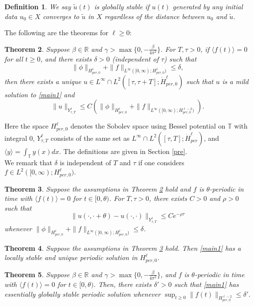 \documentclass[10pt,a4paper,final]{article}
\numberwithin{equation}{section}
\newtheorem{theorem}{Theorem}[section]
\newtheorem{definition}[theorem]{Definition}
\newcommand{\lan}{\langle}
\newcommand{\ran}{\rangle}
\newcommand{\R}{\mathbb{R}}
\newcommand{\bT}{\mathbb{T}}
\newcommand{\Gb}{\beta}
\newcommand{\Gd}{\delta}
\newcommand{\Gg}{\gamma}
\newcommand{\Gth}{\theta}
\begin{document}
\begin{definition}\label{de2-3}
    We say $\tilde u(t)$ is globally stable if  $u(t)$ generated by any initial data $u_0\in X$ converges to $\tilde u$ in $X$ regardless of the distance between $u_0$ and $\tilde u$.
\end{definition}

The following are the theorems for $\ell\ge 0$:

\begin{theorem} \label{thm1}
   Suppose $\Gb\in \R$ and $\Gg>\max\{0, -\frac{\Gb}{4\pi^2}\}$. For $T, \tau>0$, if $\lan f(t)\ran=0$ for all $t\geq0$, and  there exists $\Gd>0$ (independent of $\tau$) such that 
    $$\|\phi\|_{H^{\ell}_{per, 0}}+\|f\|_{L^{\infty}([0,\infty);H^{\ell}_{per, 0})}\leq \delta,$$ then there exists a unique $u\in L^{\infty}\cap L^2([\tau,\tau+T];\dot{H}^\ell_{per,0})$ such that $u$ is a mild solution to \eqref{main1} and  
    $$\|u\|_{Y^{\ell}_{\tau,T}}\leq C(\|\phi\|_{H^{\ell}_{per, 0}}+\|f\|_{L^{\infty}([0,\infty);H^{\ell-2}_{per, 0})}). $$
\end{theorem}
Here the space $H^{\ell}_{per, 0}$ denotes the Sobolev space using Bessel potential on $\bT$ with integral 0, $Y^\ell_{\tau,T}$ consists of the same set as $L^{\infty}\cap L^2([\tau,T];\dot{H}^\ell_{per})$, and $\lan y\ran=\int_{\bT}y(x)dx$. The definitions are given in Section \ref{pre}. \\

We remark that $\Gd$ is independent of $T$ and $\tau$ if one considers $f\in L^2([0,\infty);H^{\ell}_{per, 0})$.\\

\begin{theorem} \label{thm2}
     Suppose the assumptions in Theorem \ref{thm1} hold and $f$ is $\Gth$-periodic in time with $\lan f(t)\ran=0$ for $t\in [0,\Gth)$. For $T, \tau>0$, there exists $C>0$ and $\rho>0$ such that 
    $$\|u(\cdot, \cdot+\theta)-u(\cdot, \cdot)\|_{Y^{\ell}_{\tau,T}}\leq C e^{-\rho \tau}$$
    whenever $\|\phi\|_{H^{\ell}_{per, 0}}+\|f\|_{L^{\infty}([0,\infty);H^{\ell}_{per, 0})}\leq \delta$.
\end{theorem}
\begin{theorem} \label{thm3}
   Suppose the assumptions in Theorem \ref{thm2} hold. Then \eqref{main1} has a locally stable and unique periodic solution in $H^{\ell}_{per, 0}$. 
\end{theorem}
\begin{theorem}  \label{thm4}
   Suppose $\Gb\in \R$ and $\Gg>\max\{0, -\frac{\Gb}{4\pi^2}\}$, and  $f$ is $\Gth$-periodic in time with $\lan f(t)\ran=0$ for $t\in [0,\Gth)$. Then, there exists $\Gd'>0$ such that \eqref{main1} has essentially globally stable periodic solution whenever $\displaystyle\sup_{t\geq 0}\|f(t)\|_{H^{\ell-2}_{per, 0}}\leq \Gd'$.
\end{theorem}
\end{document}
